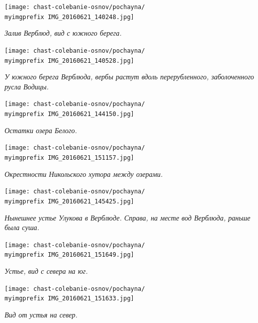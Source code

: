 \newpage

\begin{center}
\texttt{[image: chast-colebanie-osnov/pochayna/\\myimgprefix IMG\_20160621\_140248.jpg]}

\textit{Залив Верблюд, вид с южного берега.}
\end{center}

\begin{center}
\texttt{[image: chast-colebanie-osnov/pochayna/\\myimgprefix IMG\_20160621\_140528.jpg]}

\textit{У южного берега Верблюда, вербы растут вдоль перерубленного, заболоченного русла Водицы.}
\end{center}

\newpage

\begin{center}
\texttt{[image: chast-colebanie-osnov/pochayna/\\myimgprefix IMG\_20160621\_144150.jpg]}

\textit{Остатки озера Белого.}
\end{center}


\begin{center}
\texttt{[image: chast-colebanie-osnov/pochayna/\\myimgprefix IMG\_20160621\_151157.jpg]}

\textit{Окрестности Никольского хутора между озерами.}
\end{center}

\newpage

\begin{center}
\texttt{[image: chast-colebanie-osnov/pochayna/\\myimgprefix IMG\_20160621\_145425.jpg]}

\textit{Нынешнее устье Улукова в Верблюде. Справа, на месте вод Верблюда, раньше была суша.}
\end{center}

\begin{center}
\texttt{[image: chast-colebanie-osnov/pochayna/\\myimgprefix IMG\_20160621\_151649.jpg]}

\textit{Устье, вид с севера на юг.}
\end{center}

\newpage

\begin{center}
\texttt{[image: chast-colebanie-osnov/pochayna/\\myimgprefix IMG\_20160621\_151633.jpg]}

\textit{Вид от устья на север.}
\end{center}

